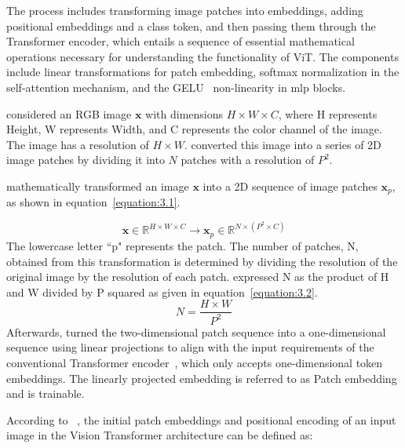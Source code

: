 The process includes transforming image patches into embeddings, adding positional embeddings and a class token, and then passing them through the Transformer encoder, which entails a sequence of essential mathematical operations necessary for understanding the functionality of ViT. The components include linear transformations for patch embedding, softmax normalization in the self-attention mechanism, and the GELU~\citep{GELU_act_fxn_hendrycks2016gaussian} non-linearity in \gls{mlp} blocks.

\citet{Vit_Paper_Dosovitskiy2020AnII} considered an RGB image $\mathbf{x}$ with dimensions $H \times W \times C$, where H represents Height, W represents Width, and C represents the color channel of the image. The image has a resolution of $H \times W$. \citet{Vit_Paper_Dosovitskiy2020AnII} converted this image into a series of 2D image patches by dividing it into $N$ patches with a resolution of $P^2$. 

\citet{Vit_Paper_Dosovitskiy2020AnII} mathematically transformed an image $\mathbf{x}$ into a 2D sequence of image patches $\mathbf{x}_p$, as shown in equation~\ref{equation:3.1}. 

\begin{equation}
\label{equation:3.1}
\mathbf{x} \in \mathbb{R}^{H \times W \times C} \rightarrow \mathbf{x}_p \in \mathbb{R}^{N \times (P^2 \times C)}
\end{equation}
The lowercase letter ``p" represents the patch. The number of patches, N, obtained from this transformation is determined by dividing the resolution of the original image by the resolution of each patch. \citet{Vit_Paper_Dosovitskiy2020AnII} expressed N as the product of H and W divided by P squared as given in equation~\ref{equation:3.2}. 
\begin{equation}
\label{equation:3.2}
N = \frac{H \times W}{P^{2}}
\end{equation}
Afterwards, \citet{Vit_Paper_Dosovitskiy2020AnII} turned the two-dimensional patch sequence into a one-dimensional sequence using linear projections to align with the input requirements of the conventional Transformer encoder~\citep{Vaswani2017AttentionIA}, which only accepts one-dimensional token embeddings. The linearly projected embedding is referred to as Patch embedding and is trainable. 

According to ~\citet{Vit_Paper_Dosovitskiy2020AnII}, the initial patch embeddings and positional encoding of an input image in the Vision Transformer architecture can be defined as:

